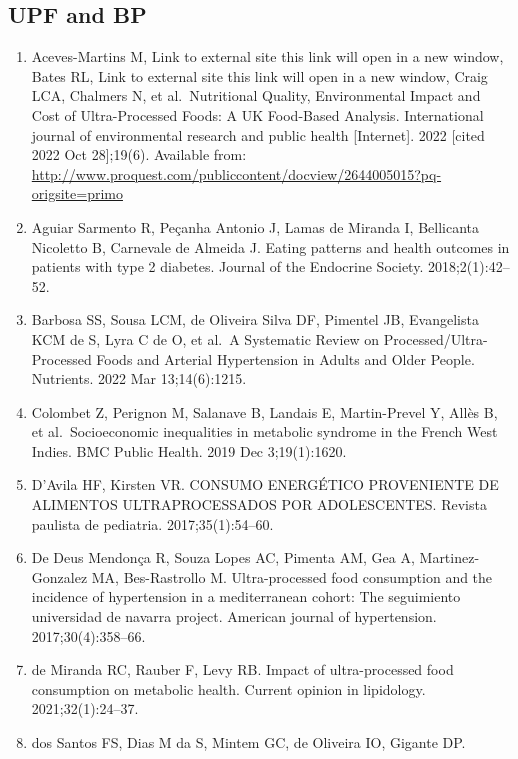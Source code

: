 \documentclass[
]{article}
\providecommand{\tightlist}{%
  \setlength{\itemsep}{0pt}\setlength{\parskip}{0pt}}
\begin{document}
\hypertarget{upf-and-bp-1}{%
\subsection{UPF and BP}\label{upf-and-bp-1}}

\begin{enumerate}
\def\labelenumi{\arabic{enumi}.}
\tightlist
\item
  Aceves-Martins M, Link to external site this link will open in a new
  window, Bates RL, Link to external site this link will open in a new
  window, Craig LCA, Chalmers N, et al.~Nutritional Quality,
  Environmental Impact and Cost of Ultra-Processed Foods: A UK
  Food-Based Analysis. International journal of environmental research
  and public health {[}Internet{]}. 2022 {[}cited 2022 Oct 28{]};19(6).
  Available from:
  \url{http://www.proquest.com/publiccontent/docview/2644005015?pq-origsite=primo}
\item
  Aguiar Sarmento R, Peçanha Antonio J, Lamas de Miranda I, Bellicanta
  Nicoletto B, Carnevale de Almeida J. Eating patterns and health
  outcomes in patients with type 2 diabetes. Journal of the Endocrine
  Society. 2018;2(1):42--52.
\item
  Barbosa SS, Sousa LCM, de Oliveira Silva DF, Pimentel JB, Evangelista
  KCM de S, Lyra C de O, et al.~A Systematic Review on
  Processed/Ultra-Processed Foods and Arterial Hypertension in Adults
  and Older People. Nutrients. 2022 Mar 13;14(6):1215.
\item
  Colombet Z, Perignon M, Salanave B, Landais E, Martin-Prevel Y, Allès
  B, et al.~Socioeconomic inequalities in metabolic syndrome in the
  French West Indies. BMC Public Health. 2019 Dec 3;19(1):1620.
\item
  D'Avila HF, Kirsten VR. CONSUMO ENERGÉTICO PROVENIENTE DE ALIMENTOS
  ULTRAPROCESSADOS POR ADOLESCENTES. Revista paulista de pediatria.
  2017;35(1):54--60.
\item
  De Deus Mendonça R, Souza Lopes AC, Pimenta AM, Gea A,
  Martinez-Gonzalez MA, Bes-Rastrollo M. Ultra-processed food
  consumption and the incidence of hypertension in a mediterranean
  cohort: The seguimiento universidad de navarra project. American
  journal of hypertension. 2017;30(4):358--66.
\item
  de Miranda RC, Rauber F, Levy RB. Impact of ultra-processed food
  consumption on metabolic health. Current opinion in lipidology.
  2021;32(1):24--37.
\item
  dos Santos FS, Dias M da S, Mintem GC, de Oliveira IO, Gigante DP.

\end{enumerate}
\end{document}
